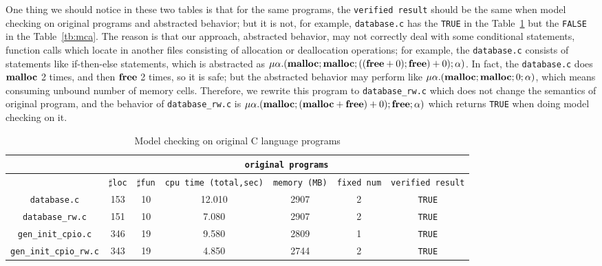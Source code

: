 One thing we should notice in these two tables is that for the same
programs, the \texttt{verified result} should be the same when model
checking on original programs and abstracted behavior; but it is not,
for example, \texttt{database.c} has the \texttt{TRUE} in the
Table~\ref{tb:mcc} but the \texttt{FALSE} in the
Table~\ref{tb:mca}. The reason is that our approach, abstracted
behavior, may not correctly deal with some conditional statements,
function calls which locate in another files consisting of allocation
or deallocation operations; for example, the \texttt{database.c}
consists of statements like if-then-else statements, which is
abstracted as $\mu\alpha.(\mathbf{malloc};\mathbf{malloc};((\mathbf{free} + 0);\mathbf{free}) +
0);\alpha)$. In fact, the \texttt{database.c} does $\mathbf{malloc}$ 2 times,
and then $\mathbf{free}$ 2 times, so it is safe; but the abstracted behavior
may perform like $\mu\alpha.(\mathbf{malloc};\mathbf{malloc};0;\alpha)$, which means
consuming unbound number of memory cells. Therefore, we rewrite this
program to \texttt{database\_rw.c} which does not change the semantics
of original program, and the behavior of \texttt{database\_rw.c} is
$\mu\alpha.(\mathbf{malloc};(\mathbf{malloc} + \mathbf{free}) + 0);\mathbf{free};\alpha)$ which
returns \texttt{TRUE} when doing model checking on it.

\begin{table}
  \scriptsize
\begin{tabular}{|c|c|c|c|c|c|c|}
\hline
& \multicolumn{6}{|c|}{\texttt{original programs}}  \\
\hline
 & $\sharp$\texttt{loc} & $\sharp$\texttt{fun} & \texttt{cpu time (total,sec)} & \texttt{memory (MB)} & \texttt{fixed num}& \texttt{verified result} \\
\hline
\texttt{database.c} & 153 & 10 & 12.010 & 2907 & 2  & \texttt{TRUE}  \\
\hline
\texttt{database\_rw.c} & 151 & 10 & 7.080 & 2907 & 2  & \texttt{TRUE}  \\
\hline
\texttt{gen\_init\_cpio.c} & 346 & 19 & 9.580 & 2809 & 1  & \texttt{TRUE}  \\
\hline
\texttt{gen\_init\_cpio\_rw.c} & 343 &19  & 4.850  & 2744  & 2  & \texttt{TRUE}  \\

\hline
\end{tabular}
\caption{Model checking on original C language programs}
\label{tb:mcc}
\end{table}


